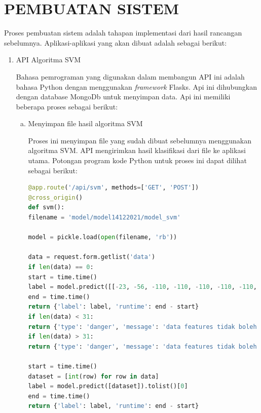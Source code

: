 \section{PEMBUATAN SISTEM}
\par Proses pembuatan sistem adalah tahapan implementasi dari hasil rancangan sebelumnya. Aplikasi-aplikasi yang akan dibuat adalah sebagai berikut:
\begin{enumerate}[1.]
	\item API Algoritma SVM
	      \par Bahasa pemrograman yang digunakan dalam membangun API ini adalah bahasa Python dengan menggunakan \textit{framework} Flasks.  Api ini dihubungkan dengan database MongoDb untuk menyimpan data. Api ini memiliki beberapa proses sebagai berikut:
	      \begin{enumerate}[a.]
		      \item Menyimpan file hasil algoritma SVM
		            \par Proses ini menyimpan file yang sudah dibuat sebelumnya menggunakan algoritma SVM. API mengirimkan hasil klasifikasi dari file ke aplikasi utama. Potongan program kode Python untuk proses ini dapat dilihat sebagai berikut:
		            \begin{lstlisting}[language=Python]
@app.route('/api/svm', methods=['GET', 'POST'])
@cross_origin()
def svm():
filename = 'model/model14122021/model_svm'
						
model = pickle.load(open(filename, 'rb'))
						
data = request.form.getlist('data')
if len(data) == 0:
start = time.time()
label = model.predict([[-23, -56, -110, -110, -110, -110, -110, -110, -110, -110, -110, -96,	-100,	-97,	-90,	-90,	-93,	-89,	-95,	-95, -85,	-78,	-95,	-95,	-88, -95,	-110,	-110,	-110,	-110,	-110]]).tolist()[0]
end = time.time()
return {'label': label, 'runtime': end - start}
if len(data) < 31:
return {'type': 'danger', 'message': 'data features tidak boleh dibawah 20'}
if len(data) > 31:
return {'type': 'danger', 'message': 'data features tidak boleh di atas 20'}	

start = time.time()
dataset = [int(row) for row in data]
label = model.predict([dataset]).tolist()[0]
end = time.time()
return {'label': label, 'runtime': end - start}				
								\end{lstlisting}


\end{enumerate}
\end{enumerate}

